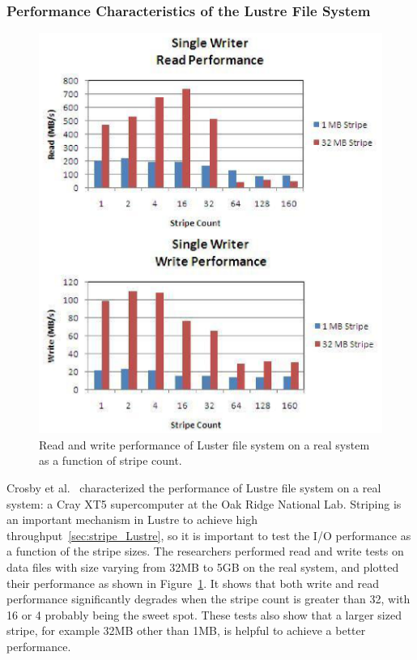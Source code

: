 \subsubsection{Performance Characteristics of the Lustre File System}
%
\begin{figure}
\centering
\includegraphics[width=0.99\columnwidth]{image/lustre_rw.png}
\caption{Read and write performance of Luster file system on a real system
	as a function of stripe count.}
\label{fig:lustre_rw}
\end{figure}
%
Crosby et al.~\cite{Crosby2009} characterized the performance of Lustre 
file system on a real system: a Cray XT5 supercomputer at the Oak Ridge
National Lab.
%
Striping is an important mechanism in Lustre to achieve high 
throughput~\ref{sec:stripe_Lustre}, so it is important to test the I/O
performance as a function of the stripe sizes.
%
The researchers performed read and write tests on data files with size
varying from 32MB to 5GB on the real system, and plotted their performance
as shown in Figure~\ref{fig:lustre_rw}.
%
It shows that both write and read performance significantly degrades when
the stripe count is greater than 32, with 16 or 4 probably being the 
sweet spot.
%
These tests also show that a larger sized stripe, for example 32MB other than 
1MB, is helpful to achieve a better performance.


